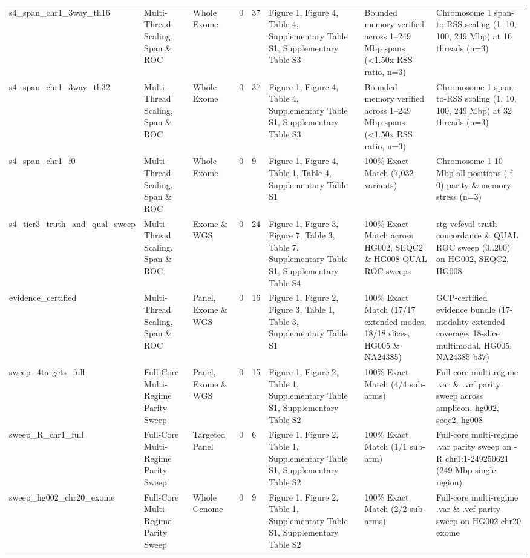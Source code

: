 \begin{table}[htbp]
{\begin{tabular}{llllllll}
s4\_span\_chr1\_3way\_th16 & Multi-Thread Scaling, Span \& ROC & Whole Exome & 0 & 37 & Figure 1, Figure 4, Table 4, Supplementary Table S1, Supplementary Table S3 & Bounded memory verified across 1--249 Mbp spans (\textless{}1.50x RSS ratio, n=3) & Chromosome 1 span-to-RSS scaling (1, 10, 100, 249 Mbp) at 16 threads (n=3) \\
s4\_span\_chr1\_3way\_th32 & Multi-Thread Scaling, Span \& ROC & Whole Exome & 0 & 37 & Figure 1, Figure 4, Table 4, Supplementary Table S1, Supplementary Table S3 & Bounded memory verified across 1--249 Mbp spans (\textless{}1.50x RSS ratio, n=3) & Chromosome 1 span-to-RSS scaling (1, 10, 100, 249 Mbp) at 32 threads (n=3) \\
s4\_span\_chr1\_f0 & Multi-Thread Scaling, Span \& ROC & Whole Exome & 0 & 9 & Figure 1, Figure 4, Table 1, Table 4, Supplementary Table S1 & 100\% Exact Match (7,032 variants) & Chromosome 1 10 Mbp all-positions (-f 0) parity \& memory stress (n=3) \\
s4\_tier3\_truth\_and\_qual\_sweep & Multi-Thread Scaling, Span \& ROC & Exome \& WGS & 0 & 24 & Figure 1, Figure 3, Figure 7, Table 3, Table 7, Supplementary Table S1, Supplementary Table S4 & 100\% Exact Match across HG002, SEQC2 \& HG008 QUAL ROC sweeps & rtg vcfeval truth concordance \& QUAL ROC sweep (0..200) on HG002, SEQC2, HG008 \\
evidence\_certified & Multi-Thread Scaling, Span \& ROC & Panel, Exome \& WGS & 0 & 16 & Figure 1, Figure 2, Figure 3, Table 1, Table 3, Supplementary Table S1 & 100\% Exact Match (17/17 extended modes, 18/18 slices, HG005 \& NA24385) & GCP-certified evidence bundle (17-modality extended coverage, 18-slice multimodal, HG005, NA24385-b37) \\
sweep\_4targets\_full & Full-Core Multi-Regime Parity Sweep & Panel, Exome \& WGS & 0 & 15 & Figure 1, Figure 2, Table 1, Supplementary Table S1, Supplementary Table S2 & 100\% Exact Match (4/4 sub-arms) & Full-core multi-regime .var \& .vcf parity sweep across amplicon, hg002, seqc2, hg008 \\
sweep\_R\_chr1\_full & Full-Core Multi-Regime Parity Sweep & Targeted Panel & 0 & 6 & Figure 1, Figure 2, Table 1, Supplementary Table S1, Supplementary Table S2 & 100\% Exact Match (1/1 sub-arm) & Full-core multi-regime .var parity sweep on -R chr1:1-249250621 (249 Mbp single region) \\
sweep\_hg002\_chr20\_exome & Full-Core Multi-Regime Parity Sweep & Whole Genome & 0 & 9 & Figure 1, Figure 2, Table 1, Supplementary Table S1, Supplementary Table S2 & 100\% Exact Match (2/2 sub-arms) & Full-core multi-regime .var \& .vcf parity sweep on HG002 chr20 exome \\

\end{tabular}}
\end{table}

